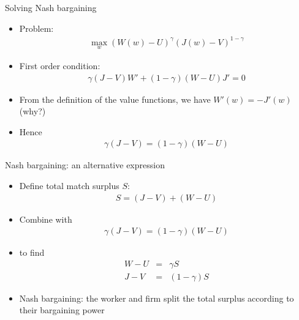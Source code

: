 \documentclass[9pt]{beamer}
\newcommand{\bit}{\begin{itemize}}
\newcommand{\eit}{\end{itemize}}
\begin{document}
\begin{frame}{Solving Nash bargaining}

	\bit
	\setlength\itemsep{1em}
	
	\item Problem:
	\begin{eqnarray}
	\max_{w} \left(W(w)-U\right)^{\gamma} \left(J(w)-V\right)^{1-\gamma} \nonumber
	\end{eqnarray}
	
	\item First order condition:
	\begin{eqnarray}
	\gamma (J-V) W' + (1-\gamma) (W-U)J' =0 \nonumber
	\end{eqnarray}
	
	\item From the definition of the value functions, we have $W'(w) = -J'(w)$ (why?)
	
	\item Hence
	\begin{eqnarray}
	\gamma (J-V) = (1-\gamma) (W-U) \nonumber
	\end{eqnarray}
	
	\eit
	\end{frame}


\begin{frame}{Nash bargaining: an alternative expression}

\bit
\setlength\itemsep{1.5em}

\item Define total match surplus $S$:
\begin{eqnarray}
S = (J-V) + (W-U) \nonumber
\end{eqnarray}


\item Combine with
\begin{eqnarray}
\gamma (J-V) = (1-\gamma) (W-U) \nonumber
\end{eqnarray}

\item to find
\begin{eqnarray}
W -U&=& \gamma S \nonumber \\
J -V&=& (1-\gamma) S \nonumber 
\end{eqnarray}

\item Nash bargaining: the worker and firm split the total surplus according to their bargaining power

\eit
\end{frame}
\end{document}
